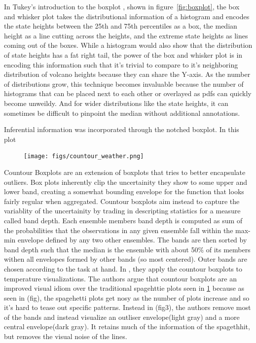 In Tukey's introduction to the boxplot \cite{tukey77e}, shown in figure~\ref{fig:boxplot}, the box and whisker plot takes the
distributional information of a histogram and encodes the state heights between the
25th and 75th percentiles as a box, the median height as a line cutting across
the heights, and the extreme state heights as lines coming out of the
boxes. While a histogram would also show that the distribution of state heights has a fat right tail,
the power of the box and whisker plot is in encoding this information such that
it's trivial to compare to it's neighboring distribution of volcano
heights because they can share the Y-axis. As the number of distributions grow,
this technique becomes invaluable because the number of histograms that can be
placed next to each other or overlayed as pdfs can quickly become
unweildy. And for wider distributions like the state heights, it can sometimes
be difficult to pinpoint the median without additional annotations. 







Inferential information was incorporated through the notched boxplot. \cite{McGill} %
In this plot 











\begin{figure}
\texttt{[image: figs/countour\_weather.png]}
\label{fig:countour}
\end{figure}
Countour Boxplots \cite{whitaker13} are an extension of boxplots that tries to better encapsulate outliers. Box plots inherently clip the uncertainity they show to some upper and lower band, 
creating a somewhat bounding envelope for the function that looks fairly regular when aggregated. Countour boxplots aim instead to capture the variablity of the uncertainity by trading in descripting
statistics for a measure called band depth. Each ensemble members band depth is computed as sum of the probabilities that the observations in any given ensemble fall within the max-min envelope defined by any two other ensembles. The bands are then sorted by band depth such that the median is the ensemble with about 50\% of its members withen all envelopes formed by other bands (so most centered). Outer bands are chosen according to the task at hand. In \cite{whitaker13}, they apply the countour boxplots to temperature visualizations. %
The authors argue that countour boxplots are an improved visual idiom over the traditional spagehttie plots seen in \ref{fig:countour} because as seen in (fig), the spagehetti plots get nosy as the number of plots increase and so it's hard to tease out specific patterns. Instead in (fig3), the authors remove most of the bands and instead visualize an outliser envelope(light gray) and a more central envelope(dark gray). It retains much of the information of the spagethhit, but removes the visual noise of the lines.  

